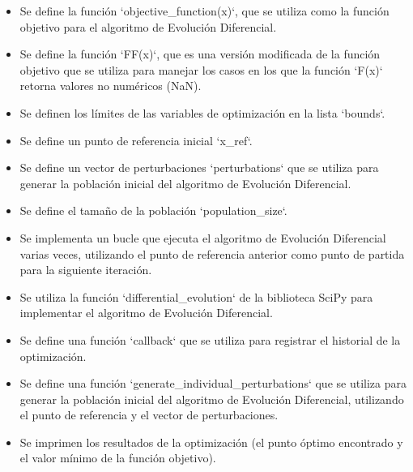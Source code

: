 \documentclass[fleqn]{article}
\begin{document}
\begin{itemize}
    \item Se define la función `objective\_function(x)`, que se utiliza como la función objetivo para el algoritmo de Evolución Diferencial.
    \item Se define la función `FF(x)`, que es una versión modificada de la función objetivo que se utiliza para manejar los casos en los que la función `F(x)` retorna valores no numéricos (NaN).
    \item Se definen los límites de las variables de optimización en la lista `bounds`.
    \item Se define un punto de referencia inicial `x\_ref`.
    \item Se define un vector de perturbaciones `perturbations` que se utiliza para generar la población inicial del algoritmo de Evolución Diferencial.
    \item Se define el tamaño de la población `population\_size`.
    \item Se implementa un bucle que ejecuta el algoritmo de Evolución Diferencial varias veces, utilizando el punto de referencia anterior como punto de partida para la siguiente iteración.
    \item Se utiliza la función `differential\_evolution` de la biblioteca SciPy para implementar el algoritmo de Evolución Diferencial.
    \item Se define una función `callback` que se utiliza para registrar el historial de la optimización.
    \item Se define una función `generate\_individual\_perturbations` que se utiliza para generar la población inicial del algoritmo de Evolución Diferencial, utilizando el punto de referencia y el vector de perturbaciones.
    \item Se imprimen los resultados de la optimización (el punto óptimo encontrado y el valor mínimo de la función objetivo).
\end{itemize}
\end{document}
